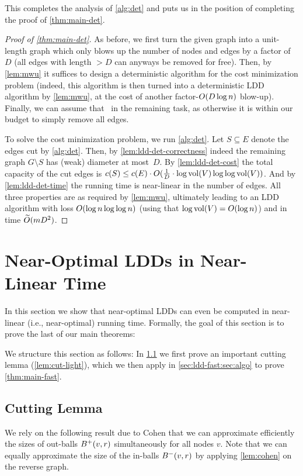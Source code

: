 \documentclass[letterpaper,11pt]{article}
\begin{document}
This completes the analysis of \cref{alg:det} and puts us in the position of completing the proof of \cref{thm:main-det}.

\begin{proof}[Proof of \cref{thm:main-det}]
As before, we first turn the given graph into a unit-length graph which only blows up the number of nodes and edges by a factor of $D$ (all edges with length $> D$ can anyways be removed for free). Then, by \cref{lem:mwu} it suffices to design a deterministic algorithm for the cost minimization problem (indeed, this algorithm is then turned into a deterministic LDD algorithm by \cref{lem:mwu}, at the cost of another factor-$O(D \log n)$ blow-up). Finally, we can assume that~ in the remaining task, as otherwise it is within our budget to simply remove all edges.

To solve the cost minimization problem, we run \cref{alg:det}. Let $S \subseteq E$ denote the edges cut by \cref{alg:det}. Then, by \cref{lem:ldd-det-correctness} indeed the remaining graph $G \setminus S$ has (weak) diameter at most~$D$. By \cref{lem:ldd-det-cost} the total capacity of the cut edges is $c(S) \leq c(E) \cdot O(\frac{1}{D} \cdot \log\operatorname{vol}(V) \log\log\operatorname{vol}(V))$. And by \cref{lem:ldd-det-time} the running time is near-linear in the number of edges. All three properties are as required by \cref{lem:mwu}, ultimately leading to an LDD algorithm with loss $O(\log n \log\log n)$ (using that $\log \operatorname{vol}(V) = O(\log n)$) and in time $\widetilde{O}(m D^2)$.
\end{proof} \section{Near-Optimal LDDs in Near-Linear Time} \label{sec:ldd-fast}
In this section we show that near-optimal LDDs can even be computed in near-linear (i.e., near-optimal) running time. Formally, the goal of this section is to prove the last of our main theorems:

\thmMainFast*

We structure this section as follows: In \cref{sec:ldd-fast:sec:cutting} we first prove an important cutting lemma (\cref{lem:cut-light}), which we then apply in \cref{sec:ldd-fast:sec:algo} to prove \cref{thm:main-fast}.

\subsection{Cutting Lemma} \label{sec:ldd-fast:sec:cutting}
We rely on the following result due to Cohen that we can approximate efficiently the sizes of out-balls $B^+(v, r)$ simultaneously for all nodes $v$. Note that we can equally approximate the size of the in-balls $B^-(v, r)$ by applying \cref{lem:cohen} on the reverse graph.
\end{document}

